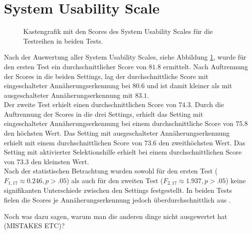 \documentclass[12pt,bibliography=totocnumbered,listof=totocnumbered,abstracton]{scrreprt}
\begin{document}
\section{System Usability Scale}
\begin{figure}
\centering
{}
\hfill
{}
\caption{Kastengrafik mit den Scores des System Usability Scales für die Testreihen in beiden Tests.}
\label{ergebnisSUS}
\end{figure}
Nach der Auswertung aller System Usability Scales, siehe Abbildung \ref{ergebnisSUS}, wurde für den ersten Test ein durchschnittlicher Score von $81.8$ ermittelt. Nach Auftrennung der Scores in die beiden Settings, lag der durchschnittliche Score mit eingeschalteter Annäherungserkennung bei $80.6$ und ist damit kleiner als mit ausgeschalteter Annäherungserkennung mit $83.1$.\\
Der zweite Test erhielt einen durchschnittlichen Score von $74.3$. Durch die Auftrennung der Scores in die drei Settings, erhielt das Setting mit eingeschalteter Annäherungserkennung bei einem durchschnittliche Score von $75.8$ den höchsten Wert. Das Setting mit ausgeschalteter Annäherungserkennung erhielt mit einem durchschnittlichen Score von $73.6$ den zweithöchsten Wert. Das Setting mit aktivierter Selektionshilfe erhielt bei einem durchschnittlichen Score von $73.3$ den kleinsten Wert.\\
Nach der statistischen Betrachtung wurden sowohl für den ersten Test ($F_{1,17}\approx 0.246, p > .05$) als auch für den zweiten Test ($F_{2,17}\approx 1.937, p > .05$) keine signifikanten Unterschiede zwischen den Settings festgestellt. In beiden Tests fielen die Scores je Annäherungserkennung jedoch überdurchschnittlich aus \citep{sus2013}.

Noch was dazu sagen, warum man die anderen dinge nicht ausgewertet hat (MISTAKES ETC)?
\end{document}
